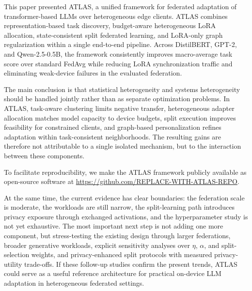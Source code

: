 \documentclass[conference]{IEEEtran}
\begin{document}
This paper presented ATLAS, a unified framework for federated adaptation of transformer-based LLMs over heterogeneous edge clients. ATLAS combines representation-based task discovery, budget-aware heterogeneous LoRA allocation, state-consistent split federated learning, and LoRA-only graph regularization within a single end-to-end pipeline. Across DistilBERT, GPT-2, and Qwen-2.5-0.5B, the framework consistently improves macro-average task score over standard FedAvg while reducing LoRA synchronization traffic and eliminating weak-device failures in the evaluated federation.

The main conclusion is that statistical heterogeneity and systems heterogeneity should be handled jointly rather than as separate optimization problems. In ATLAS, task-aware clustering limits negative transfer, heterogeneous adapter allocation matches model capacity to device budgets, split execution improves feasibility for constrained clients, and graph-based personalization refines adaptation within task-consistent neighborhoods. The resulting gains are therefore not attributable to a single isolated mechanism, but to the interaction between these components.

To facilitate reproducibility, we make the ATLAS framework publicly available as open-source software at \url{https://github.com/REPLACE-WITH-ATLAS-REPO}.

At the same time, the current evidence has clear boundaries: the federation scale is moderate, the workloads are still narrow, the split-learning path introduces privacy exposure through exchanged activations, and the hyperparameter study is not yet exhaustive. The most important next step is not adding one more component, but stress-testing the existing design through larger federations, broader generative workloads, explicit sensitivity analyses over $\eta$, $\alpha$, and split-selection weights, and privacy-enhanced split protocols with measured privacy-utility trade-offs. If these follow-up studies confirm the present trends, ATLAS could serve as a useful reference architecture for practical on-device LLM adaptation in heterogeneous federated settings.




\end{document}
